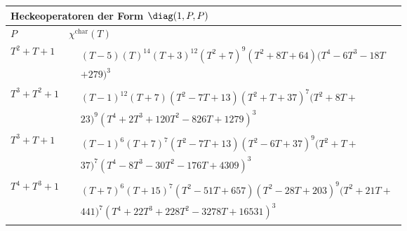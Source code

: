 \begin{tabular}{| l | l |}
\multicolumn{2}{l}{\bf Heckeoperatoren der Form $\diag(1,P,P)$} \\
\hline
$P$ & $\chi^\text{char}(T)$ \\
\hline
$T^2 + T + 1$ &
$\!\begin{aligned}
	&(T - 5)(T)^{14}(T + 3)^{12}(T^{2} + 7)^{9}(T^{2} + 8T + 64)(T^{4} - 6T^{3} - 18T\\&
+ 279)^{3}\end{aligned}$ \\
\hline
$T^3 + T^2 + 1$ &
$\!\begin{aligned}
	&(T - 1)^{12}(T + 7)(T^{2} - 7T + 13)(T^{2} + T + 37)^{7}(T^{2} + 8T + \\&
23)^{9}(T^{4} + 2T^{3} + 120T^{2} - 826T + 1279)^{3}\end{aligned}$ \\
\hline
$T^3 + T + 1$ &
$\!\begin{aligned}
	&(T - 1)^{6}(T + 7)^{7}(T^{2} - 7T + 13)(T^{2} - 6T + 37)^{9}(T^{2} + T + \\&
37)^{7}(T^{4} - 8T^{3} - 30T^{2} - 176T + 4309)^{3}\end{aligned}$ \\
\hline
$T^4 + T^3 + 1$ &
$\!\begin{aligned}
	&(T + 7)^{6}(T + 15)^{7}(T^{2} - 51T + 657)(T^{2} - 28T + 203)^{9}(T^{2} + 21T + \\&
441)^{7}(T^{4} + 22T^{3} + 228T^{2} - 3278T + 16531)^{3}\end{aligned}$ \\
\hline
\end{tabular}


